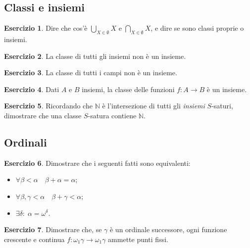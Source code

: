 \documentclass[a4paper,10pt,oneside]{article}
\theoremstyle{plain}
\theoremstyle{definition}
\newtheorem{myex}{Esercizio}
\theoremstyle{remark}
\begin{document}
\subsection{Classi e insiemi}
\begin{myex}
 Dire che cos'è $\bigcup_{X\in \emptyset} X$ e $\bigcap_{X\in \emptyset} X$, e dire se sono classi proprie o insiemi.
\end{myex}
\begin{myex}
 La classe di tutti gli insiemi non è un insieme.
\end{myex}
\begin{myex}
 La classe di tutti i campi non è un insieme.
\end{myex}



\begin{myex}
 Dati $A$ e $B$ insiemi, la classe delle funzioni $f: A\rightarrow B$ è un insieme.
\end{myex}

\begin{myex}\label{ex:classisature}
 Ricordando che $\mathbb N$ è l'intersezione di tutti gli \emph{insiemi} $S$-saturi, dimostrare che una classe $S$-satura contiene $\mathbb N$.
\end{myex}



\subsection{Ordinali}

\begin{myex} Dimostrare che i seguenti fatti sono equivalenti:
\begin{itemize}
 \item $\forall \beta < \alpha \quad \beta + \alpha=\alpha$;
 \item $\forall \beta,\gamma <\alpha \quad \beta +\gamma <\alpha$;
 \item $\exists \delta: \; \alpha=\omega^\delta$.
\end{itemize}
\end{myex}

\begin{myex}\label{ex:puntifissi}
 Dimostrare che, se $\gamma$ è un ordinale successore, ogni funzione crescente e continua $f:\omega_1\gamma\rightarrow\omega_1\gamma$ ammette punti fissi.
\end{myex}
\end{document}

